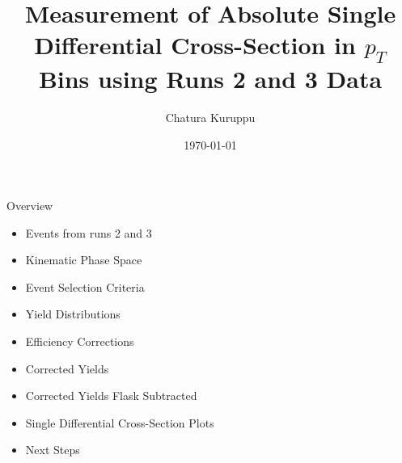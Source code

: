 \documentclass[aspectratio=169]{beamer}
\title{Measurement of Absolute Single Differential Cross-Section in $p_T$ Bins using Runs 2 and 3 Data}
\author{Chatura Kuruppu}
\institute{New Mexico State University\\ \vspace{0.1cm} SeaQuest Experiment (E906)}
\date{\today}
\begin{document}
\begin{frame}
    \titlepage
\end{frame}

\begin{frame}{Overview}
    
\begin{itemize}
    \setlength{\itemsep}{0.5em}
    \item Events from runs 2 and 3
    \item Kinematic Phase Space
    \item Event Selection Criteria
    \item Yield Distributions
    \item Efficiency Corrections
    \item Corrected Yields
    \item Corrected Yields Flask Subtracted
    \item Single Differential Cross-Section Plots
    \item Next Steps
\end{itemize}

\end{frame}
\end{document}
